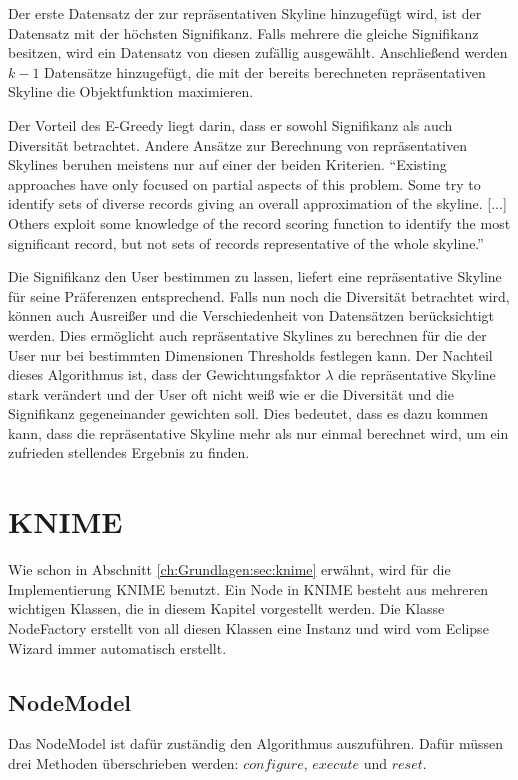 Der erste Datensatz der zur repräsentativen Skyline hinzugefügt wird, ist der Datensatz mit der höchsten Signifikanz. Falls mehrere die gleiche Signifikanz besitzen, wird ein Datensatz von diesen zufällig ausgewählt.
Anschließend werden $k-1$ Datensätze hinzugefügt, die mit der bereits berechneten repräsentativen Skyline die Objektfunktion maximieren.

Der Vorteil des E-Greedy liegt darin, dass er sowohl Signifikanz als auch Diversität betrachtet. Andere Ansätze zur Berechnung von repräsentativen Skylines beruhen meistens nur auf einer der beiden Kriterien.  
\enquote{Existing approaches have only focused on partial aspects of this problem. Some try to identify sets of diverse records giving an overall approximation of the skyline. [...] Others exploit some knowledge of the record scoring function to identify the most significant record, but not sets of records representative of the whole skyline.} \cite[p. 1]{magnani2014taking}
 
Die Signifikanz den User bestimmen zu lassen, liefert eine repräsentative Skyline für seine Präferenzen entsprechend. Falls nun noch die Diversität betrachtet wird, können auch Ausreißer und die Verschiedenheit von Datensätzen berücksichtigt werden. Dies ermöglicht auch repräsentative Skylines zu berechnen für die der User nur bei bestimmten Dimensionen Thresholds festlegen kann.
Der Nachteil dieses Algorithmus ist, dass der Gewichtungsfaktor $\lambda$ die repräsentative Skyline stark verändert und der User oft nicht weiß wie er die Diversität und die Signifikanz gegeneinander gewichten soll. Dies bedeutet, dass es dazu kommen kann, dass die repräsentative Skyline mehr als nur einmal berechnet wird, um ein zufrieden stellendes Ergebnis zu finden.
\section{KNIME}
\label{ch:Analyse:sec:knime}
Wie schon in Abschnitt \ref{ch:Grundlagen:sec:knime} erwähnt, wird für die Implementierung KNIME benutzt. Ein Node in KNIME besteht aus mehreren wichtigen Klassen, die in diesem Kapitel vorgestellt werden. Die Klasse NodeFactory erstellt von all diesen Klassen eine Instanz und wird vom Eclipse Wizard immer automatisch erstellt.
\subsection{NodeModel}
\label{ch:Analyse:sec:knime:subsec:nodeModel}
Das NodeModel ist dafür zuständig den Algorithmus auszuführen. Dafür müssen drei Methoden überschrieben werden: $configure$, $execute$ und $reset$.

